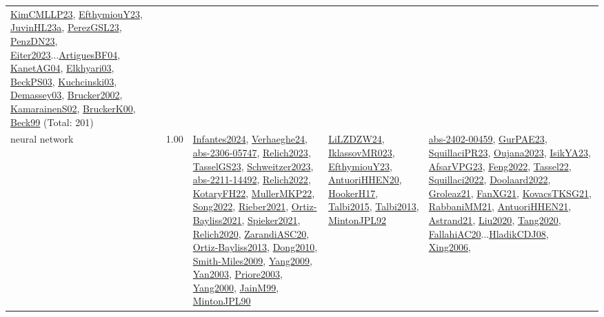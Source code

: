 {\begin{longtable}{p{3cm}r>{\raggedright\arraybackslash}p{6cm}>{\raggedright\arraybackslash}p{6cm}>{\raggedright\arraybackslash}p{8cm}}
\hyperref[detail:KimCMLLP23]{KimCMLLP23}, \hyperref[detail:EfthymiouY23]{EfthymiouY23}, \hyperref[detail:JuvinHL23a]{JuvinHL23a}, \hyperref[detail:PerezGSL23]{PerezGSL23}, \hyperref[detail:PenzDN23]{PenzDN23}, \hyperref[detail:Eiter2023]{Eiter2023}...\hyperref[detail:ArtiguesBF04]{ArtiguesBF04}, \hyperref[detail:KanetAG04]{KanetAG04}, \hyperref[detail:Elkhyari03]{Elkhyari03}, \hyperref[detail:BeckPS03]{BeckPS03}, \hyperref[detail:Kuchcinski03]{Kuchcinski03}, \hyperref[detail:Demassey03]{Demassey03}, \hyperref[detail:Brucker2002]{Brucker2002}, \hyperref[detail:KamarainenS02]{KamarainenS02}, \hyperref[detail:BruckerK00]{BruckerK00}, \hyperref[detail:Beck99]{Beck99} (Total: 201)\\
\index{neural network}\index{Algorithms!neural network}neural network &  1.00 & \hyperref[detail:Infantes2024]{Infantes2024}, \hyperref[detail:Verhaeghe24]{Verhaeghe24}, \hyperref[detail:abs-2306-05747]{abs-2306-05747}, \hyperref[detail:Relich2023]{Relich2023}, \hyperref[detail:TasselGS23]{TasselGS23}, \hyperref[detail:Schweitzer2023]{Schweitzer2023}, \hyperref[detail:abs-2211-14492]{abs-2211-14492}, \hyperref[detail:Relich2022]{Relich2022}, \hyperref[detail:KotaryFH22]{KotaryFH22}, \hyperref[detail:MullerMKP22]{MullerMKP22}, \hyperref[detail:Song2022]{Song2022}, \hyperref[detail:Rieber2021]{Rieber2021}, \hyperref[detail:Ortiz-Bayliss2021]{Ortiz-Bayliss2021}, \hyperref[detail:Spieker2021]{Spieker2021}, \hyperref[detail:Relich2020]{Relich2020}, \hyperref[detail:ZarandiASC20]{ZarandiASC20}, \hyperref[detail:Ortiz-Bayliss2013]{Ortiz-Bayliss2013}, \hyperref[detail:Dong2010]{Dong2010}, \hyperref[detail:Smith-Miles2009]{Smith-Miles2009}, \hyperref[detail:Yang2009]{Yang2009}, \hyperref[detail:Yan2003]{Yan2003}, \hyperref[detail:Priore2003]{Priore2003}, \hyperref[detail:Yang2000]{Yang2000}, \hyperref[detail:JainM99]{JainM99}, \hyperref[detail:MintonJPL90]{MintonJPL90} & \hyperref[detail:LiLZDZW24]{LiLZDZW24}, \hyperref[detail:IklassovMR023]{IklassovMR023}, \hyperref[detail:EfthymiouY23]{EfthymiouY23}, \hyperref[detail:AntuoriHHEN20]{AntuoriHHEN20}, \hyperref[detail:HookerH17]{HookerH17}, \hyperref[detail:Talbi2015]{Talbi2015}, \hyperref[detail:Talbi2013]{Talbi2013}, \hyperref[detail:MintonJPL92]{MintonJPL92} & \hyperref[detail:abs-2402-00459]{abs-2402-00459}, \hyperref[detail:GurPAE23]{GurPAE23}, \hyperref[detail:SquillaciPR23]{SquillaciPR23}, \hyperref[detail:Oujana2023]{Oujana2023}, \hyperref[detail:IsikYA23]{IsikYA23}, \hyperref[detail:AfsarVPG23]{AfsarVPG23}, \hyperref[detail:Feng2022]{Feng2022}, \hyperref[detail:Tassel22]{Tassel22}, \hyperref[detail:Squillaci2022]{Squillaci2022}, \hyperref[detail:Doolaard2022]{Doolaard2022}, \hyperref[detail:Groleaz21]{Groleaz21}, \hyperref[detail:FanXG21]{FanXG21}, \hyperref[detail:KovacsTKSG21]{KovacsTKSG21}, \hyperref[detail:RabbaniMM21]{RabbaniMM21}, \hyperref[detail:AntuoriHHEN21]{AntuoriHHEN21}, \hyperref[detail:Astrand21]{Astrand21}, \hyperref[detail:Liu2020]{Liu2020}, \hyperref[detail:Tang2020]{Tang2020}, \hyperref[detail:FallahiAC20]{FallahiAC20}...\hyperref[detail:HladikCDJ08]{HladikCDJ08}, \hyperref[detail:Xing2006]{Xing2006}, 
\end{longtable}}
